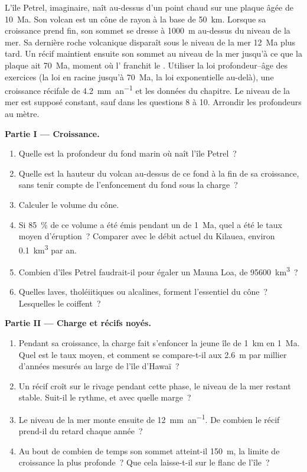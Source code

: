 \begin{problem}\label{pb:b2:oceanic-islands:1}
L'île Petrel, imaginaire, naît au-dessus d'un point chaud sur une plaque âgée de \qty{10}{Ma}. Son volcan est
un cône de rayon à la base de \qty{50}{km}. Lorsque sa croissance prend fin, son sommet se dresse à \qty{1000}{m}
au-dessus du niveau de la mer. Sa dernière roche volcanique disparaît sous le niveau de la mer \qty{12}{Ma} plus
tard. Un récif maintient ensuite son sommet au niveau de la mer jusqu'à ce que la plaque ait \qty{70}{Ma}, moment
où l' franchit le . Utiliser la loi profondeur--âge des exercices (la loi en racine jusqu'à
\qty{70}{Ma}, la loi exponentielle au-delà), une croissance récifale de \qty{4.2}{mm.an^{-1}} et les données du
chapitre. Le niveau de la mer est supposé constant, sauf dans les questions 8 à 10. Arrondir les profondeurs au mètre.

\noindent\textbf{Partie I --- Croissance.}
\begin{enumerate}
  \item Quelle est la profondeur du fond marin où naît l'île Petrel~?
  \item Quelle est la hauteur du volcan au-dessus de ce fond à la fin de sa croissance, sans tenir compte de
        l'enfoncement du fond sous la charge~?
  \item Calculer le volume du cône.
  \item Si \qty{85}{\percent} de ce volume a été émis pendant un  de \qty{1}{Ma}, quel a été le
        taux moyen d'éruption~? Comparer avec le débit actuel du Kilauea, environ
        \qty{0.1}{km^3} par an.
  \item Combien d'îles Petrel faudrait-il pour égaler un Mauna Loa, de \qty{95600}{km^3}~?
  \item Quelles laves, tholéiitiques ou alcalines, forment l'essentiel du cône~? Lesquelles le coiffent~?
\end{enumerate}

\noindent\textbf{Partie II --- Charge et récifs noyés.}
\begin{enumerate}[resume]
  \item Pendant sa croissance, la charge fait s'enfoncer la jeune île de \qty{1}{km} en \qty{1}{Ma}. Quel est le
        taux moyen, et comment se compare-t-il aux \qty{2.6}{m} par millier d'années mesurés
        au large de l'île d'Hawaï~?
  \item Un récif croît sur le rivage pendant cette phase, le niveau de la mer restant stable. Suit-il le rythme, et
        avec quelle marge~?
  \item Le niveau de la mer monte ensuite de \qty{12}{mm.an^{-1}}. De combien le récif prend-il du retard chaque
        année~?
  \item Au bout de combien de temps son sommet atteint-il \qty{150}{m}, la limite de croissance la plus profonde~? Que cela
        laisse-t-il sur le flanc de l'île~?
\end{enumerate}


\end{problem}
